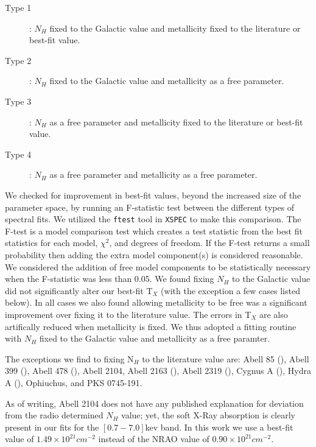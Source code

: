 \documentclass[12pt, preprint]{aastex}
\begin{document}
\begin{description}
\item[Type 1]: $N_H$ fixed to the Galactic
value and metallicity fixed to the literature or best-fit value.
\item[Type 2]: $N_H$ fixed to the Galactic
value and metallicity as a free parameter.
\item[Type 3]: $N_H$ as a free parameter and
metallicity fixed to the literature or best-fit value.
\item[Type 4]: $N_H$ as a free parameter and
metallicity as a free parameter.
\end{description}

We checked for improvement in best-fit values, beyond the increased size of the
parameter space, by running an F-statistic test between the different
types of spectral fits. We utilized the {\tt ftest} tool in {\tt XSPEC} to
make this comparison. The F-test is a model comparison test
which creates a test statistic from the best fit statistics for each
model, $\chi^2$, and degrees of freedom. If the F-test
returns a small probability then adding the extra model
component(s) is considered reasonable. We considered the addition of
free model components to be statistically necessary when the
F-statistic was less than 0.05. We found fixing $N_{H}$ to the Galactic value did not
significantly alter our best-fit T$_X$ (with the exception a few cases
listed below). In all cases we also found allowing metallicity to be free was a
significant improvement over fixing it to the literature
value. The errors in T$_X$ are also artifically reduced when
metallicity is fixed. We thus adopted a fitting
routine with $N_{H}$ fixed to the Galactic value and metallicity as a free 
paramter.

The exceptions we find to fixing N$_H$ to the literature value are: Abell 85
(\cite{2005A&A...432..809D}), Abell 399 (\cite{2004MNRAS.351.1439S}),
Abell 478 (\cite{2003ApJ...587..619S}), Abell 2104,  Abell
2163 (\cite{1992ApJ...390..345A}), Abell 2319
(\cite{2004ApJ...604..604O}), Cygnus A (\cite{2002ApJ...565..195S}), Hydra A
(\cite{2000ApJ...534L.135M}), Ophiuchus, and PKS 0745-191.

As of writing, Abell 2104 does not have any published
explanation for deviation from the radio determined $N_H$ value; yet,
the soft X-Ray absorption is clearly present in our fits for
the $[0.7-7.0]$kev band. In this work we use a best-fit value of $1.49\times10^{21}
cm^{-2}$ instead of the NRAO value of $0.90\times10^{21} cm^{-2}$.
\end{document}
